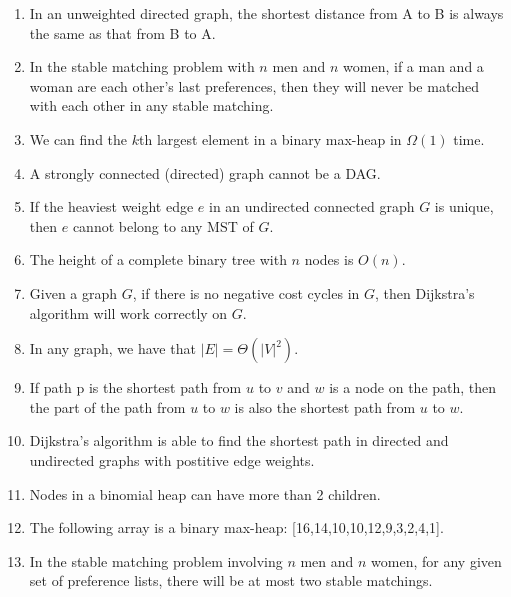 \documentclass[12pt]{article}
\begin{document}
\begin{enumerate}
    \item In an unweighted directed graph, the shortest distance from A to B is always the same as that from B to A.
    \item In the stable matching problem with $n$ men and $n$ women, if a man and a woman are each other's last preferences, then they will never be matched with each other in any stable matching.
    \item We can find the $k$th largest element in a binary max-heap in $\Omega(1)$ time.
    \item A strongly connected (directed) graph cannot be a DAG.
    \item If the heaviest weight edge $e$ in an undirected connected graph $G$ is unique, then $e$ cannot belong to any MST of $G$.
    \item The height of a complete binary tree with $n$ nodes is $O(n)$.
    \item Given a graph $G$, if there is no negative cost cycles in $G$, then Dijkstra's algorithm will work correctly on $G$.
    \item In any graph, we have that $|E|=\Theta(|V|^2)$.
    \item If path p is the shortest path from $u$ to $v$ and $w$ is a node on the path, then the part of the path from $u$ to $w$ is also the shortest path from $u$ to $w$.
    \item Dijkstra's algorithm is able to find the shortest path in directed and undirected graphs with postitive edge weights.
    \item Nodes in a binomial heap can have more than 2 children.
    \item The following array is a binary max-heap: [16,14,10,10,12,9,3,2,4,1].
    \item In the stable matching problem involving $n$ men and $n$ women, for any given set of preference lists, there will be at most two stable matchings.
\end{enumerate}
\end{document}
